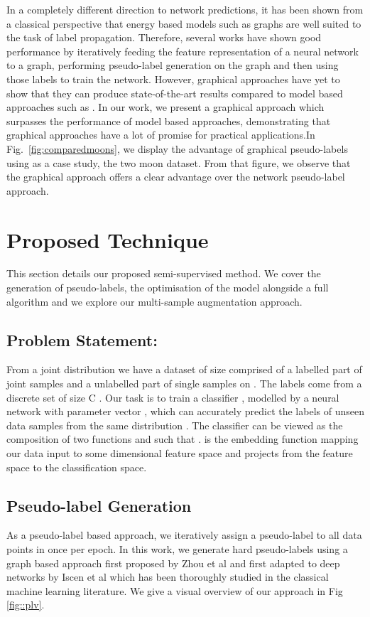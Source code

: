 \documentclass[journal]{IEEEtran}
\begin{document}
In a completely different direction to network predictions, it has been shown from a classical perspective \cite{zhu2003semi} that energy based models such as graphs are well suited to the task of label propagation.  Therefore, several works \cite{iscen2019label,aviles2019beyond,li2020density}  have shown good performance by iteratively feeding the feature representation of a neural network to a graph, performing pseudo-label generation on the graph and then using those labels to train the network. However, graphical approaches have yet to show that they can produce state-of-the-art results compared to model based approaches such as \cite{sohn2020fixmatch,xie2019unsupervised}.  In our work, we present a graphical approach which surpasses the performance of model based approaches, demonstrating that graphical approaches have a lot of promise for practical applications.In Fig.~\ref{fig:comparedmoons}, we display the advantage of graphical pseudo-labels using as a case study, the two moon dataset. From that figure, we observe that the graphical approach offers a clear advantage over the network pseudo-label approach.  


\section{Proposed Technique}
This section details our proposed semi-supervised method. We cover the generation of pseudo-labels, the optimisation of the model alongside a full algorithm and we explore our multi-sample augmentation approach.

\smallskip
\subsection{Problem Statement:} From a joint distribution  we have a dataset  of size  comprised of a labelled part of joint samples  and a unlabelled part  of single samples on . The labels come from a discrete set of size C . Our task is to train a classifier , modelled by a neural network with parameter vector , which can accurately predict the labels of unseen data samples from the same distribution .  The classifier   can be viewed as the composition of two functions  and  such that .  is the embedding function mapping our data input to some  dimensional feature space and  projects from the feature space to the classification space. 


\subsection{Pseudo-label Generation}
As a pseudo-label based approach, we iteratively assign a pseudo-label  to all data points in  once  per epoch. In this work, we generate hard pseudo-labels using a graph based approach first proposed by Zhou et al \cite{zhou2004learning} and first adapted to deep networks by Iscen et al \cite{iscen2019label} which has been thoroughly studied in the classical machine learning literature. We give a visual overview of our approach in Fig \ref{fig::plv}. 
\end{document}
